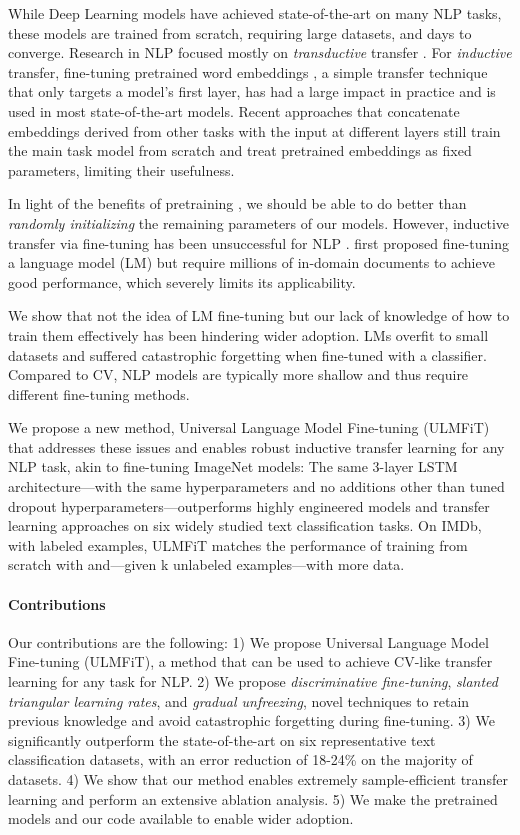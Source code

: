\documentclass[11pt,a4paper]{article}
\begin{document}
While Deep Learning models have achieved state-of-the-art on many NLP tasks, these models are trained from scratch, requiring large datasets, and days to converge. Research in NLP focused mostly on \emph{transductive} transfer \cite{Blitzer2007}. For \emph{inductive} transfer, fine-tuning pretrained word embeddings \cite{Mikolov2013d}, a simple transfer technique that only targets a model's first layer, has had a large impact in practice and is used in most state-of-the-art models. Recent approaches that concatenate embeddings derived from other tasks with the input at different layers \cite{peters2017semi,Mccann2017,deepcontext2017} still train the main task model from scratch and treat pretrained embeddings as fixed parameters, limiting their usefulness. 

In light of the benefits of pretraining \cite{erhan2010does}, we should be able to do better than \emph{randomly initializing} the remaining parameters of our models. However, inductive transfer via fine-tuning has been unsuccessful for NLP \cite{Mou2016}.  first proposed fine-tuning a language model (LM) but require millions of in-domain documents to achieve good performance, which severely limits its applicability.

We show that not the idea of LM fine-tuning but our lack of knowledge of how to train them effectively has been hindering wider adoption. LMs overfit to small datasets and suffered catastrophic forgetting when fine-tuned with a classifier. Compared to CV, NLP models are typically more shallow and thus require different fine-tuning methods. 

We propose a new method, Universal Language Model Fine-tuning (ULMFiT) that addresses these issues and enables robust inductive transfer learning for any NLP task, akin to fine-tuning ImageNet models: The same 3-layer LSTM architecture---with the same hyperparameters and no additions other than tuned dropout hyperparameters---outperforms highly engineered models and transfer learning approaches on six widely studied text classification tasks. On IMDb, with  labeled examples, ULMFiT matches the performance of training from scratch with  and---given k unlabeled examples---with  more data.

\paragraph{Contributions} Our contributions are the following: 1) We propose Universal Language Model Fine-tuning (ULMFiT), a method that can be used to achieve CV-like transfer learning for any task for NLP. 2) We propose \emph{discriminative fine-tuning}, \emph{slanted triangular learning rates}, and \emph{gradual unfreezing}, novel techniques to retain previous knowledge and avoid catastrophic forgetting during fine-tuning. 3) We significantly outperform the state-of-the-art on six representative text classification datasets, with an error reduction of 18-24\% on the majority of datasets. 4) We show that our method enables extremely sample-efficient transfer learning and perform an extensive ablation analysis. 5) We make the pretrained models and our code available to enable wider adoption.
\end{document}
